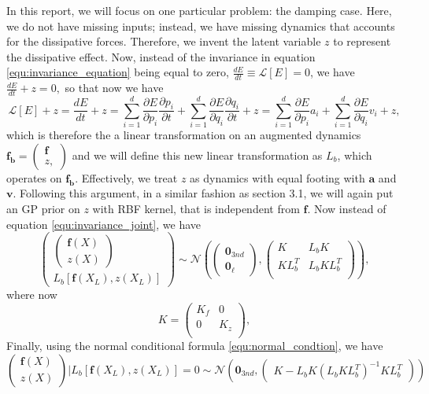 \documentclass{statsmsc}
\begin{document}
In this report, we will focus on one particular problem: the damping case.
Here, we do not have missing inputs; instead, we have missing dynamics that accounts for the dissipative forces. 
Therefore, we invent the latent variable $z$ to represent the dissipative effect.
Now, instead of the invariance in equation \ref{equ:invariance_equation} being equal to zero, $\frac{dE}{dt}\equiv\mathcal{L}[E]=0$, we have $\frac{dE}{dt}+z=0,$ so that now we have 
\begin{equation}
\mathcal{L}[E] + z = \frac{dE}{dt} + z =\sum_{i=1}^d \frac{\partial E}{\partial p_i} \frac{\partial p_i}{\partial t}+ \sum_{i=1}^d\frac{\partial E}{\partial q_i}\frac{\partial q_i}{\partial t} + z = \sum_{i=1}^d \frac{\partial E}{\partial p_i} a_i + \sum_{i=1}^d\frac{\partial E}{\partial q_i} v_i + z,
\end{equation}
which is therefore the a linear transformation on an augmented dynamics $\mathbf{f_b}=\begin{pmatrix}
  \mathbf{f}\\z,
\end{pmatrix}$
and we will define this new linear transformation as $L_b$, which operates on $\mathbf{f_b}.$
Effectively, we treat $z$ as dynamics with equal footing with $\mathbf{a}$ and $\mathbf{v}$.
Following this argument, in a similar fashion as section 3.1, we will again put an GP prior on $z$ with RBF kernel, that is independent from $\mathbf{f}$.
Now instead of equation \ref{equ:invariance_joint}, we have 
$$
\begin{pmatrix}
\begin{pmatrix}\mathbf{f}(X)\\ z(X)\end{pmatrix}\\L_b[\mathbf{f}(X_L), z(X_L)]
\end{pmatrix}
\sim\mathcal{N}
\left(\begin{pmatrix}\mathbf{0}_{3nd}\\\mathbf{0}_{\ell}\end{pmatrix}, \begin{pmatrix}
    K & L_bK \\
    KL_b^T & L_bKL_b^T\\
\end{pmatrix}\right),
$$
where now 
$$
K = \begin{pmatrix}
  K_f & 0 \\
  0 & K_z\\
\end{pmatrix},
$$
Finally, using the normal conditional formula \ref{equ:normal_condtion}, we have 
\begin{equation}
  \begin{pmatrix}\mathbf{f}(X) \\ z(X) \end{pmatrix}|L_b[\mathbf{f}(X_L), z(X_L)]=0 \sim \mathcal{N} \left(\mathbf{0}_{3nd}, \begin{pmatrix}
    K-L_bK(L_bKL_b^T)^{-1}KL_b^T
  \end{pmatrix}\right)
\end{equation}
\end{document}

